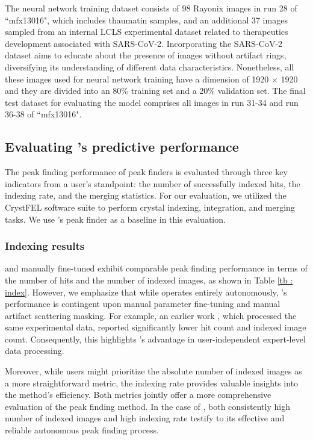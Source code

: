 \documentclass[a4paper]{article}
\begin{document}
The neural network training dataset consists of 98 Rayonix images in run 28 of ``mfx13016", which includes thaumatin samples, and an additional 37 images sampled from an internal LCLS experimental dataset related to therapeutics development associated with SARS-CoV-2.  Incorporating the SARS-CoV-2 dataset aims to educate \peaknet{} about the presence of images without artifact rings, diversifying its understanding of different data characteristics.  Nonetheless, all these images used for neural network training have a dimension of 1920 $\times$ 1920 and they are divided into an 80\% training set and a 20\% validation set.  The final test dataset for evaluating the model comprises all images in run 31-34 and run 36-38 of ``mfx13016".


\subsection{Evaluating \peaknet{}'s predictive performance}

The peak finding performance of peak finders is evaluated through three key indicators from a user's standpoint: the number of successfully indexed hits, the indexing rate, and the merging statistics.  For our evaluation, we utilized the CrystFEL software suite \citep{whiteCrystFELSoftwareSuite2012} to perform crystal indexing, integration, and merging tasks.  We use \psocake{}'s peak finder as a baseline in this evaluation.

\subsubsection{Indexing results}

\peaknet{} and manually fine-tuned \psocake{} exhibit comparable peak finding performance in terms of the number of hits and the number of indexed images, as shown in Table \ref{tb : index}.  However, we emphasize that while \peaknet{} operates entirely autonomously, \psocake{}'s performance is contingent upon manual parameter fine-tuning and manual artifact scattering masking.  For example, an earlier work \citep{suSerialCrystallographyUsing2021}, which processed the same experimental data, reported significantly lower hit count and indexed image count.  Consequently, this highlights \peaknet{}'s advantage in user-independent expert-level data processing.

Moreover, while users might prioritize the absolute number of indexed images as a more straightforward metric, the indexing rate provides valuable insights into the method's efficiency.  Both metrics jointly offer a more comprehensive evaluation of the peak finding method. In the case of \peaknet{}, both consistently high number of indexed images and high indexing rate testify to its effective and reliable autonomous peak finding process.
\end{document}
